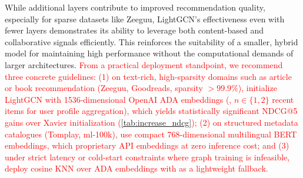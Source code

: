 While additional layers contribute to improved recommendation quality, especially for sparse datasets like Zeeguu, LightGCN’s effectiveness even with fewer layers demonstrates its ability to leverage both content-based and collaborative signals efficiently. This reinforces the suitability of a smaller, hybrid model for maintaining high performance without the computational demands of larger architectures. \textcolor{red}{From a practical deployment standpoint, we recommend three concrete guidelines: (1) on text-rich, high-sparsity domains such as article or book recommendation (Zeeguu, Goodreads, sparsity $>99.9\%$), initialize LightGCN with 1536-dimensional OpenAI ADA embeddings (, $n \in \{1, 2\}$ recent items for user profile aggregation), which yields statistically significant NDCG@5 gains over Xavier initialization (\autoref{tab:increase_ndcg}); (2) on structured metadata catalogues (Tomplay, ml-100k), use compact 768-dimensional multilingual BERT embeddings, which  proprietary API embeddings  at zero inference cost; and (3) under strict latency or cold-start constraints where graph training is infeasible, deploy cosine KNN over ADA embeddings with  as a lightweight fallback.}